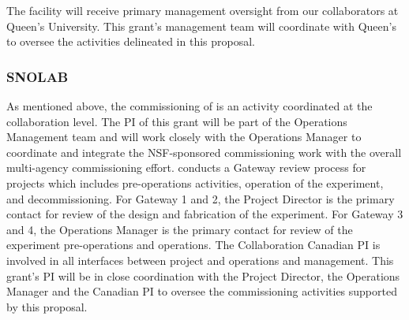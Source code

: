 The \cute facility will receive primary management oversight from our collaborators at Queen's University. This grant's management team will coordinate with Queen's to oversee the \cute activities delineated in this proposal.

\subsubsection{SNOLAB}

As mentioned above, the commissioning of \scs is an activity coordinated at the collaboration level. The PI of this grant will be part of the Operations Management team and will work closely with the \scs Operations Manager to coordinate and integrate the NSF-sponsored commissioning work with the overall multi-agency commissioning effort. \SNOLAB conducts a Gateway review process for projects which includes pre-operations activities, operation of the experiment, and decommissioning. For Gateway 1 and 2, the Project Director is the primary contact for review of the design and fabrication of the \scs experiment. For Gateway 3 and 4, the Operations Manager is the primary contact for review of the experiment pre-operations and operations. The Collaboration Canadian PI is involved in all interfaces between \scs project and operations and \SNOLAB management.  This grant's PI will be in close coordination with the Project Director, the Operations Manager and the Canadian PI to oversee the commissioning activities supported by this proposal.

%
%


